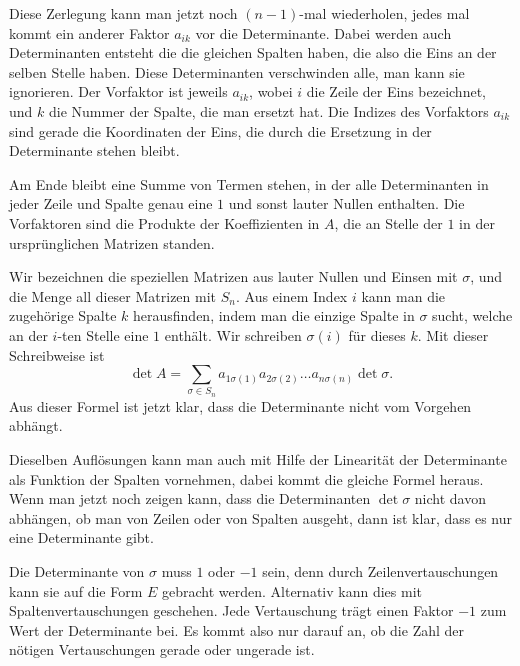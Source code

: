 Diese Zerlegung kann man jetzt noch $(n-1)$-mal wiederholen,
jedes mal kommt ein anderer Faktor $a_{ik}$ vor die Determinante.
Dabei werden auch Determinanten entsteht die die gleichen Spalten
haben, die also die Eins an der selben Stelle haben.
Diese Determinanten verschwinden alle, man kann sie ignorieren.
Der Vorfaktor ist
jeweils $a_{ik}$, wobei $i$ die Zeile der Eins bezeichnet, und $k$
die Nummer der Spalte, die man ersetzt hat.
Die Indizes des
Vorfaktors $a_{ik}$ sind gerade die Koordinaten der Eins, die durch
die Ersetzung in der Determinante stehen bleibt.

Am Ende bleibt eine Summe von Termen stehen, in der alle Determinanten
in jeder Zeile und Spalte genau eine $1$ und sonst lauter Nullen
enthalten.
Die Vorfaktoren sind die Produkte der Koeffizienten in $A$,
die an Stelle der $1$ in der ursprünglichen Matrizen standen.

Wir bezeichnen die speziellen Matrizen aus lauter Nullen und Einsen
mit $\sigma$, und die Menge all dieser Matrizen mit $S_n$.
Aus einem
Index $i$ kann man die zugehörige Spalte $k$ herausfinden, indem
man die einzige Spalte in $\sigma$ sucht, welche an der $i$-ten
Stelle eine $1$ enthält.
Wir schreiben $\sigma(i)$ für dieses $k$.
Mit dieser Schreibweise ist 
\[
\det A=\sum_{\sigma\in S_n}
a_{1\sigma(1)}
a_{2\sigma(2)}
\dots
a_{n\sigma(n)}
\det \sigma.
\]
Aus dieser Formel ist jetzt klar, dass die Determinante nicht vom
Vorgehen abhängt.

Dieselben Auflösungen kann man auch mit Hilfe der Linearität der
Determinante als Funktion der Spalten vornehmen, dabei kommt die 
gleiche Formel heraus.
Wenn man jetzt noch zeigen kann, dass
die Determinanten $\det\sigma$ nicht davon abhängen, ob man von
Zeilen oder von Spalten ausgeht, dann ist klar, dass es nur eine
Determinante gibt.

Die Determinante von $\sigma$ muss $1$ oder $-1$ sein, denn durch
Zeilenvertauschungen kann sie auf die Form $E$ gebracht werden.
Alternativ kann dies mit Spaltenvertauschungen geschehen.
Jede Vertauschung trägt einen Faktor $-1$ zum Wert der Determinante bei.
Es kommt also nur darauf an, ob die Zahl der nötigen
Vertauschungen gerade oder ungerade ist.
